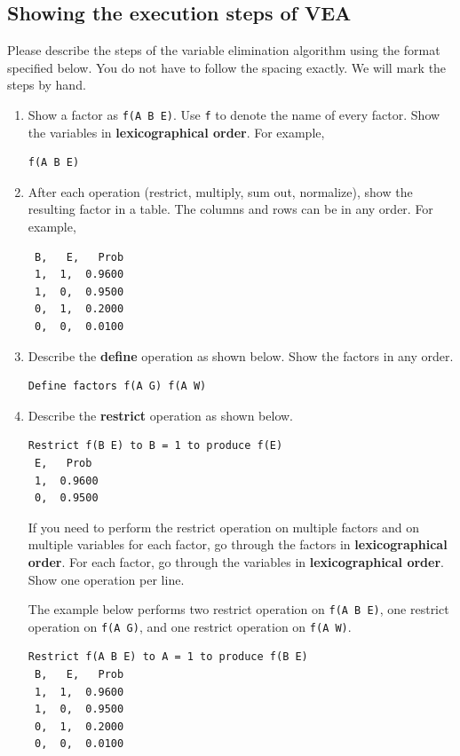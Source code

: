 \documentclass[12pt]{article}
\begin{document}
\newpage
\subsection{Showing the execution steps of VEA}
\label{sec:vea_steps}

Please describe the steps of the variable elimination algorithm using the format specified below. You do not have to follow the spacing exactly. We will mark the steps by hand.

\begin{enumerate}

\item 
Show a factor as \verb+f(A B E)+. Use \verb+f+ to denote the name of every factor. Show the variables in {\bf lexicographical order}. For example,
%
\begin{verbatim}
f(A B E)
\end{verbatim}

\item 
After each operation (restrict, multiply, sum out, normalize), show the resulting factor in a table. The columns and rows can be in any order. For example,
%
\begin{verbatim}
 B,   E,   Prob
 1,  1,  0.9600
 1,  0,  0.9500
 0,  1,  0.2000
 0,  0,  0.0100
\end{verbatim}


\item 
Describe the {\bf define} operation as shown below. Show the factors in any order.
%
\begin{verbatim}
Define factors f(A G) f(A W)
\end{verbatim}

\item
Describe the {\bf restrict} operation as shown below.  
\begin{verbatim}
Restrict f(B E) to B = 1 to produce f(E)
 E,   Prob
 1,  0.9600
 0,  0.9500
\end{verbatim}

If you need to perform the restrict operation on multiple factors and on multiple variables for each factor, go through the factors in {\bf lexicographical order}. For each factor, go through the variables in {\bf lexicographical order}. Show one operation per line. 

The example below performs two restrict operation on \verb+f(A B E)+, one restrict operation on \verb+f(A G)+, and one restrict operation on \verb+f(A W)+.
%
\begin{verbatim}
Restrict f(A B E) to A = 1 to produce f(B E)
 B,   E,   Prob
 1,  1,  0.9600
 1,  0,  0.9500
 0,  1,  0.2000
 0,  0,  0.0100


\end{verbatim}
\end{enumerate}
\end{document}
